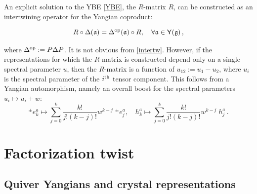 \documentclass[10pt]{article}
\theoremstyle{definition}
\def\fa{\mathfrak{a}}
\def\fg{\mathfrak{g}}
\def\myY{{\mathsf{Y}}}
\def\lm{\limits}
\numberwithin{equation}{section}
\begin{document}
An explicit solution to the YBE \eqref{YBE}, the $R$-matrix $R$, can be constructed as an intertwining operator for the Yangian coproduct:
\begin{tcolorbox}
\begin{equation}\label{intertw}
	R\circ \Delta(\fa)=\Delta^{\rm op}(\fa)\circ R,\quad \forall\fa\in \myY(\fg)\,,
\end{equation}
\end{tcolorbox}
\noindent where $\Delta^{\rm op}:=P\Delta P$.
It is not obvious from \eqref{intertw}. 
However, if the representations for which the $R$-matrix is constructed depend only on a single spectral parameter $u$, then the $R$-matrix is a function of $u_{12}:=u_1-u_2$, where $u_i$ is the spectral parameter of the $i^{\rm th}$ tensor component.
This follows from a Yangian automorphism, namely an overall boost for the spectral parameters $u_i\mapsto u_i+w$:
\begin{equation}
	{}^{\pm}e_k^a\mapsto\sum\lm_{j=0}^k\frac{k!}{j!(k-j)!} w^{k-j} \;{}^{\pm}e_j^a,\quad h_k^a\mapsto\sum\lm_{j=0}^k\frac{k!}{j!(k-j)!} w^{k-j}\; h_j^a\,.
\end{equation}



\section{Factorization twist}\label{sec:fact_twist}

\subsection{Quiver Yangians and crystal representations}
\end{document}

